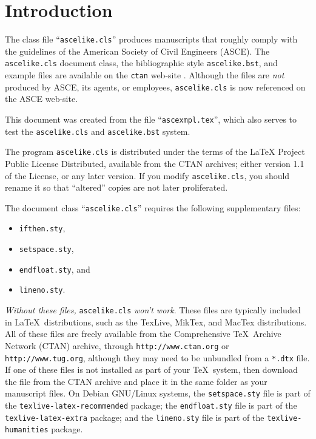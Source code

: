 \documentclass[Proceedings]{ascelike}
\begin{document}
\section{Introduction}
The class file ``\texttt{ascelike.cls}''
produces manuscripts that roughly comply with the
guidelines of the American Society of Civil Engineers (ASCE).
The \texttt{ascelike.cls} document class, the 
bibliographic style \texttt{ascelike.bst}, and
example files are available on the \texttt{ctan}
web-site \cite{Kuhn:2011a}.
Although the files are \emph{not} produced by ASCE, its agents,
or employees, \texttt{ascelike.cls} is now referenced on
the ASCE web-site.
\par
This document was created from the file
``\texttt{ascexmpl.tex}'', which also serves to test the 
\texttt{ascelike.cls} and \texttt{ascelike.bst} system.
\par
The program \texttt{ascelike.cls} is distributed under the
terms of the LaTeX Project Public License Distributed,
available from the CTAN archives;
either version 1.1 of the License, or any later version.
If you modify
\texttt{ascelike.cls}, you should rename it so that ``altered''
copies are not later proliferated.
\par
The document class ``\texttt{ascelike.cls}'' requires the following
supplementary files:
\begin{itemize}
\item
\texttt{ifthen.sty}, 
\item
\texttt{setspace.sty}, 
\item
\texttt{endfloat.sty}, and 
\item
\texttt{lineno.sty}.
\end{itemize}
\emph{Without these files,} \texttt{ascelike.cls} \emph{won't work}.
These files are typically included in \LaTeX\ distributions, such as the
\textsf{TexLive}, \textsf{MikTex}, and \textsf{MacTex} distributions.
All of these files are freely available
from the Comprehensive \TeX\ Archive Network (CTAN) archive,
through \verb+http://www.ctan.org+ or
\verb+http://www.tug.org+, although they may need to be unbundled from
a \verb+*.dtx+ file.
If one of these files is not installed as part of your \TeX\ system,
then download the file from the CTAN archive and place it in the same folder
as your manuscript files.
On Debian GNU/Linux systems, the \texttt{setspace.sty}
file is part of the \texttt{texlive-latex-re\-com\-mended} package;
the \texttt{endfloat.sty} 
file is part of the \texttt{texlive-latex-extra} package;
and the \texttt{lineno.sty} 
file is part of the \texttt{texlive-humanities} package.
\end{document}
